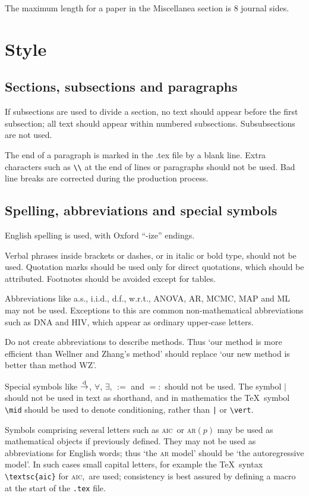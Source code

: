 \documentclass[article,lineno]{biometrika}
\def\AIC{\textsc{aic}}
\begin{document}
The maximum length for a paper in the Miscellanea section is 8 journal sides.

\section{Style}

\subsection{Sections, subsections and paragraphs}

If subsections are used to divide a section, no text should appear before the first subsection; all text should appear within numbered subsections.  Subsubsections are not used.

The end of a paragraph is marked in the .tex file by a blank line.  Extra characters such as \verb+\\+ at the end of lines or paragraphs should not be used.  Bad line breaks are corrected during the production process.

\subsection{Spelling, abbreviations and special symbols}

English spelling is used, with Oxford ``-ize'' endings.

Verbal phrases inside brackets or dashes, or in italic or bold type, should not be used. Quotation marks should be used only for direct quotations, which should be attributed. Footnotes should be avoided except for tables.

Abbreviations like a.s., i.i.d., d.f., w.r.t.,  ANOVA, AR, MCMC, MAP and ML may not be used.  Exceptions to this are common non-mathematical abbreviations such as DNA and HIV, which appear as ordinary upper-case letters.

Do not create abbreviations to describe methods. Thus `our method is more efficient than Wellner and Zhang's method' should replace `our new method is better than method WZ'.

Special symbols like $\mathop{\rightarrow}\limits^{\rm d}$, $\forall$, $\exists$, $:=$ and $=:$  should not be used.  The symbol $\mid$ should not be used in text as shorthand, and in mathematics the \TeX\ symbol \verb+\mid+ should be used to denote conditioning, rather than \verb+|+ or \verb"\vert".

Symbols comprising several letters such as \AIC\ or \textsc{ar}$(p)$ may be used as mathematical objects if previously defined. They may not be used as abbreviations for English words; thus `the \textsc{ar} model' should be `the autoregressive model'.   In such cases small capital letters, for example the  \TeX\ syntax \verb+\textsc{aic}+ for \AIC,\ are used; consistency is best assured by defining a macro at the start of the \texttt{.tex}  file.
\end{document}
